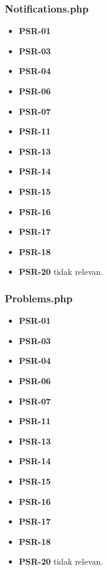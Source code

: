 \subsubsection{Notifications.php}
\begin{itemize}
	\item \textbf{PSR-01} 
	\item \textbf{PSR-03}
	\item \textbf{PSR-04}
	\item \textbf{PSR-06}
	\item \textbf{PSR-07}
	\item \textbf{PSR-11}
	\item \textbf{PSR-13}
	\item \textbf{PSR-14}
	\item \textbf{PSR-15}
	\item \textbf{PSR-16}
	\item \textbf{PSR-17} 
	\item \textbf{PSR-18} 
	\item \textbf{PSR-20} tidak relevan.
\end{itemize}

\subsubsection{Problems.php}
\begin{itemize}
	\item \textbf{PSR-01} 
	\item \textbf{PSR-03}
	\item \textbf{PSR-04}
	\item \textbf{PSR-06}
	\item \textbf{PSR-07}
	\item \textbf{PSR-11}
	\item \textbf{PSR-13}
	\item \textbf{PSR-14}
	\item \textbf{PSR-15}
	\item \textbf{PSR-16}
	\item \textbf{PSR-17} 
	\item \textbf{PSR-18} 
	\item \textbf{PSR-20} tidak relevan.
\end{itemize}

